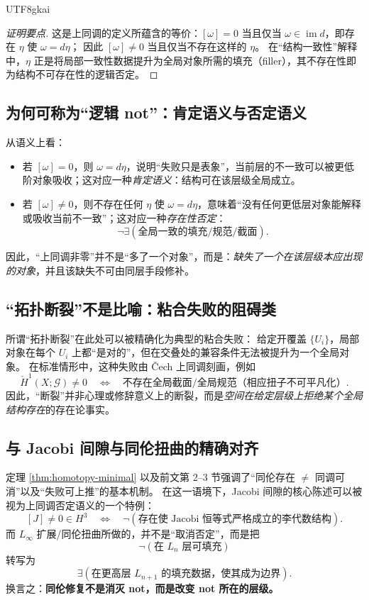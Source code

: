 \documentclass[12pt]{article}
\begin{document}
\begin{CJK*}{UTF8}{gkai}
\begin{proof}[证明要点]
这是上同调的定义所蕴含的等价：$[\omega]=0$ 当且仅当 $\omega\in\operatorname{im} d$，即存在 $\eta$ 使 $\omega=d\eta$；
因此 $[\omega]\neq 0$ 当且仅当不存在这样的 $\eta$。
在“结构一致性”解释中，$\eta$ 正是将局部一致性数据提升为全局对象所需的填充（filler），其不存在性即为结构不可存在性的逻辑否定。
\end{proof}

\subsection{为何可称为“逻辑 not”：肯定语义与否定语义}

从语义上看：
\begin{itemize}
  \item 若 $[\omega]=0$，则 $\omega=d\eta$，说明“失败只是表象”，当前层的不一致可以被更低阶对象吸收；这对应一种\emph{肯定语义}：结构可在该层级全局成立。
  \item 若 $[\omega]\neq 0$，则不存在任何 $\eta$ 使 $\omega=d\eta$，意味着“没有任何更低层对象能解释或吸收当前不一致”；这对应一种\emph{存在性否定}：
  \[
    \neg\exists(\text{全局一致的填充/规范/截面}) .
  \]
\end{itemize}

因此，“上同调非零”并不是“多了一个对象”，而是：\emph{缺失了一个在该层级本应出现的对象}，并且该缺失不可由同层手段修补。

\subsection{“拓扑断裂”不是比喻：粘合失败的阻碍类}

所谓“拓扑断裂”在此处可以被精确化为典型的粘合失败：
给定开覆盖 $\{U_i\}$，局部对象在每个 $U_i$ 上都“是对的”，但在交叠处的兼容条件无法被提升为一个全局对象。
在标准情形中，这种失败由 \v{C}ech 上同调刻画，例如
\[
  \check H^1(X;\mathcal{G})\neq 0
  \quad\Longleftrightarrow\quad
  \text{不存在全局截面/全局规范（相应扭子不可平凡化）}.
\]
因此，“断裂”并非心理或修辞意义上的断裂，而是\emph{空间在给定层级上拒绝某个全局结构存在}的存在论事实。

\subsection{与 Jacobi 间隙与同伦扭曲的精确对齐}

定理 \ref{thm:homotopy-minimal} 以及前文第 2--3 节强调了“同伦存在 $\neq$ 同调可消”以及“失败可上推”的基本机制。
在这一语境下，Jacobi 间隙的核心陈述可以被视为上同调否定语义的一个特例：
\[
  [J]\neq 0 \in H^3
  \quad\Longleftrightarrow\quad
  \neg(\text{存在使 Jacobi 恒等式严格成立的李代数结构}) .
\]
而 $L_\infty$ 扩展/同伦扭曲所做的，并不是“取消否定”，而是把
\[
  \neg(\text{在 }L_n\text{ 层可填充})
\]
转写为
\[
  \exists(\text{在更高层 }L_{n+1}\text{ 的填充数据，使其成为边界}) .
\]
换言之：\textbf{同伦修复不是消灭 not，而是改变 not 所在的层级。}


\end{CJK*}
\end{document}
